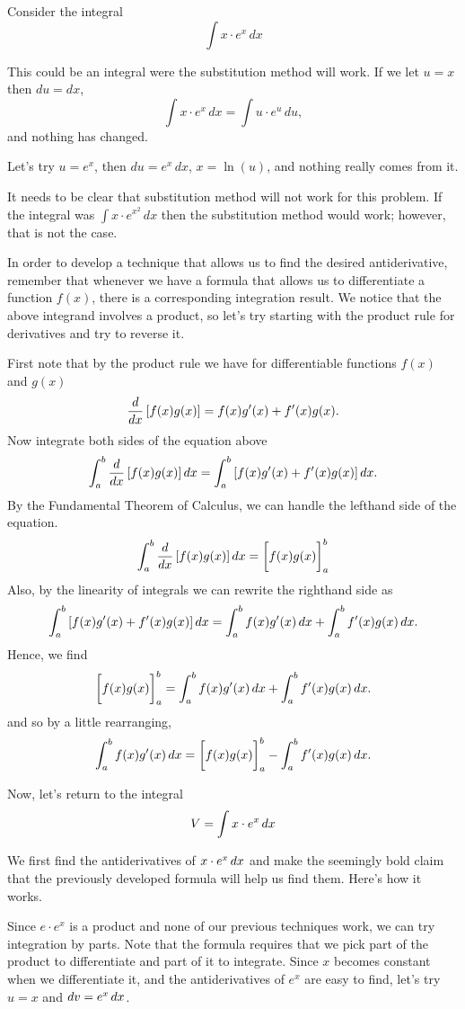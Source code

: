 \documentclass[noauthor]{ximera}
\begin{document}
\begin{model}
  Consider the integral
    \[
      \int x\cdot e^x\, dx
    \]
    \begin{explanation}
      This could be an integral were the substitution method will work. If we let $u=x$ then $du=dx$,
        \[
          \int x\cdot e^x\, dx = \int u\cdot e^u\, du,
        \]
        and nothing has changed.

      Let's try $u=e^x$, then $du=e^x\, dx$, $x=\ln(u)$, and nothing really comes from it.

      It needs to be clear that substitution method will not work for this problem. If the integral was $\int x\cdot e^{x^2}\, dx$ then the substitution method would work; however, that is not the case.
    \end{explanation}


In order to develop a technique that allows us to find the desired antiderivative, remember that whenever we have a formula that allows us to differentiate a function $f(x)$, there is a corresponding integration result.  We notice that the above integrand involves a product, so let's try starting with the product rule for derivatives and try to reverse it.

First note that by the product rule we have for differentiable functions $f(x)$ and $g(x)$
\[
\frac{d}{\mathop{}\!d x} \left[f(x)g(x)\right] = f(x)g'(x) + f'(x) g(x).
\]
Now integrate both sides of the equation above
\[
\int_a^b \frac{d}{\mathop{}\!d x} \left[ f(x) g(x) \right] \mathop{}\!d x = \int_a^b \left[f(x)g'(x) + f'(x) g(x)\right] \mathop{}\!d x.
\]
By the Fundamental Theorem of Calculus, we can handle the lefthand side of the equation.
\[
\int_a^b \frac{d}{\mathop{}\!d x} \left[f(x) g(x)\right] \mathop{}\!d x = \bigg[ f(x)g(x) \bigg]_a^b
\]
Also, by the linearity of integrals we can rewrite the righthand side as
\[
 \int_a^b \left[f(x)g'(x) + f'(x) g(x)\right] \mathop{}\!d x = \int_a^b f(x)g'(x)\mathop{}\!d x + \int_a^b f'(x) g(x) \mathop{}\!d x.
\]
Hence, we find
\[
\bigg[ f(x)g(x) \bigg]_a^b = \int_a^b f(x)g'(x)\mathop{}\!d x + \int_a^b f'(x) g(x) \mathop{}\!d x.
\]
and so by a little rearranging,
\[
 \int_a^b f(x)g'(x)\mathop{}\!d x = \bigg[ f(x)g(x) \bigg]_a^b -  \int_a^b f'(x) g(x) \mathop{}\!d x.
\]

Now, let's return to the integral
\[
V=\int x\cdot e^x \mathop{}\!d x
\]

We first find the antiderivatives of $x\cdot e^x \mathop{}\!d x$ and make the seemingly bold claim that the previously developed formula will help us find them.  Here's how it works.

Since $e\cdot e^x$ is a product and none of our previous techniques work, we can try integration by parts.  Note that the formula requires that we pick part of the product to differentiate and part of it to integrate.  Since $x$ becomes constant when we differentiate it, and the antiderivatives of $e^x$ are easy to find, let's try $u=x$ and $\mathop{}\!d v=e^x \mathop{}\!d x$.


\end{model}
\end{document}
